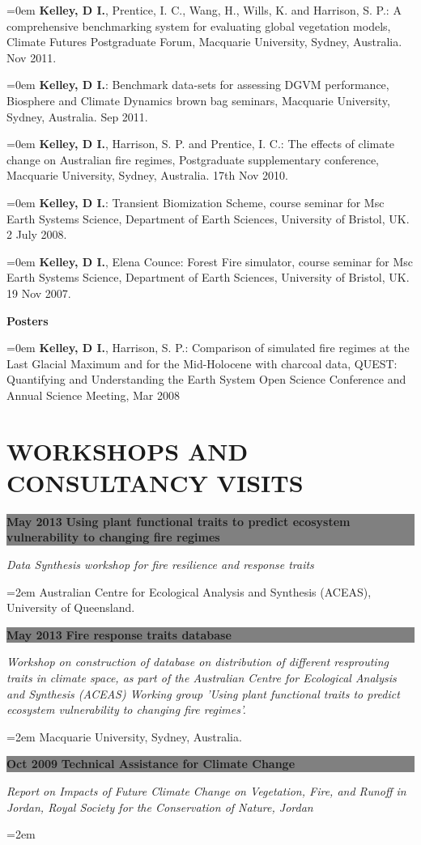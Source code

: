 \documentclass[paper=a4,fontsize=11pt]{scrartcl}	 			%
\newcommand{\sepspace}{\vspace*{0em}}			%
\newcommand{\NewPart}[1]{\vspace*{-0.5em} \section*{\uppercase{#1}} \vspace*{-0.75em} }
\newcommand{\EducationEntry}[4]{ \vspace*{0.7em}
		\noindent \colorbox{gray}{%
			\parbox{46em}{%
			\color{Black}\textbf{#2} \hspace{0.5cm} \textbf{#1}}} 				%
		\vspace*{-1em}
		\hfill 	\par				%
		\noindent \textit{#3} \par					%
		\noindent\hangindent=2em\hangafter=0 \small #4 	%
		\normalsize \par}
\newcommand{\BibEntry}[2]{
		\vspace*{-1em} \noindent \textbf{#1} \hfill \par					%
		\hangindent=0em\hangafter=0 \small #2} 	%
\begin{document}
\BibEntry{} {\textbf{Kelley, D I.}, Prentice, I. C., Wang, H., Wills, K. and Harrison, S. P.: A comprehensive benchmarking system for evaluating global vegetation models, Climate Futures Postgraduate Forum, Macquarie University, Sydney, Australia. Nov 2011.}


\BibEntry{} {\textbf{Kelley, D I.}: Benchmark data-sets for assessing DGVM performance, Biosphere and Climate Dynamics brown bag seminars, Macquarie University, Sydney, Australia. Sep 2011.}

\BibEntry{} {\textbf{Kelley, D I.}, Harrison, S. P. and Prentice, I. C.: The effects of climate change on Australian fire regimes, Postgraduate supplementary conference, Macquarie University, Sydney, Australia. 17th Nov 2010.}

\BibEntry{} {\textbf{Kelley, D I.}: Transient Biomization Scheme, course seminar for Msc Earth Systems Science, Department of Earth Sciences, University of Bristol, UK. 2 July 2008.}

\BibEntry{} {\textbf{Kelley, D I.}, Elena Counce: Forest Fire simulator, course seminar for Msc Earth Systems Science, Department of Earth Sciences, University of Bristol, UK. 19 Nov 2007.}
\sepspace

\BibEntry{\newline \newline  Posters} {\textbf{Kelley, D I.}, Harrison, S. P.: Comparison of simulated fire regimes at the Last Glacial Maximum and for the Mid-Holocene with charcoal data, QUEST: Quantifying and Understanding the Earth System Open Science Conference and Annual Science Meeting, Mar 2008}
\NewPart{Workshops and Consultancy Visits}
\EducationEntry{Using plant functional traits to predict ecosystem vulnerability to changing fire regimes}{May 2013} {\newline \newline Data Synthesis workshop for fire resilience and response traits}{Australian Centre for Ecological Analysis and Synthesis (ACEAS), University of Queensland.}
\sepspace

\EducationEntry{Fire response traits database}{May 2013} {Workshop on construction of database on distribution of different resprouting traits in climate space, as part of the Australian Centre for Ecological Analysis and Synthesis (ACEAS) Working group 'Using plant functional traits to predict ecosystem vulnerability to changing fire regimes'.}{Macquarie University, Sydney, Australia.}
\sepspace

\EducationEntry{Technical Assistance for Climate Change}{Oct 2009} {Report on Impacts of Future Climate Change on Vegetation, Fire, and Runoff in Jordan, Royal Society for the Conservation of Nature, Jordan}
\sepspace
\end{document}
